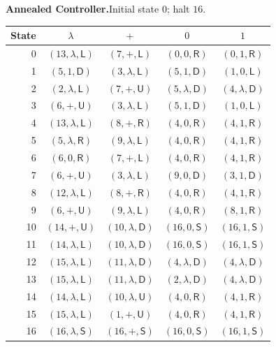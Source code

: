 \documentclass[11pt,a4paper]{article}
\newcommand{\blank}{\lambda}
\newcommand{\triple}[3]{(#1,#2,\mathsf{#3})}
\begin{document}
\vspace{5pt}
\textbf{Annealed Controller.}\quad Initial state $0$; halt $16$.
\begin{center}
\fontsize{9.4}{11.2}\selectfont\renewcommand{\arraystretch}{1.06}
\setlength{\tabcolsep}{10pt}
\begin{tabular}{rcccc}
\toprule
\rowcolor{Pale}State & $\blank$ & $+$ & $0$ & $1$\\
\midrule
0 & $\triple{13}{\blank}{L}$ & $\triple{7}{+}{L}$ & $\triple{0}{0}{R}$ & $\triple{0}{1}{R}$ \\
1 & $\triple{5}{1}{D}$ & $\triple{3}{\blank}{L}$ & $\triple{5}{1}{D}$ & $\triple{1}{0}{L}$ \\
2 & $\triple{2}{\blank}{L}$ & $\triple{7}{+}{U}$ & $\triple{5}{\blank}{D}$ & $\triple{4}{\blank}{D}$ \\
3 & $\triple{6}{+}{U}$ & $\triple{3}{\blank}{L}$ & $\triple{5}{1}{D}$ & $\triple{1}{0}{L}$ \\
4 & $\triple{13}{\blank}{L}$ & $\triple{8}{+}{R}$ & $\triple{4}{0}{R}$ & $\triple{4}{1}{R}$ \\
5 & $\triple{5}{\blank}{R}$ & $\triple{9}{\blank}{L}$ & $\triple{4}{0}{R}$ & $\triple{4}{1}{R}$ \\
6 & $\triple{6}{0}{R}$ & $\triple{7}{+}{L}$ & $\triple{4}{0}{R}$ & $\triple{4}{1}{R}$ \\
7 & $\triple{6}{+}{U}$ & $\triple{3}{\blank}{L}$ & $\triple{9}{0}{D}$ & $\triple{3}{1}{D}$ \\
8 & $\triple{12}{\blank}{L}$ & $\triple{8}{+}{R}$ & $\triple{4}{0}{R}$ & $\triple{4}{1}{R}$ \\
9 & $\triple{6}{+}{U}$ & $\triple{9}{\blank}{L}$ & $\triple{4}{0}{R}$ & $\triple{8}{1}{R}$ \\
10 & $\triple{14}{+}{U}$ & $\triple{10}{\blank}{D}$ & $\triple{16}{0}{S}$ & $\triple{16}{1}{S}$ \\
11 & $\triple{14}{\blank}{L}$ & $\triple{10}{\blank}{D}$ & $\triple{16}{0}{S}$ & $\triple{16}{1}{S}$ \\
12 & $\triple{15}{\blank}{L}$ & $\triple{11}{\blank}{D}$ & $\triple{4}{\blank}{D}$ & $\triple{4}{\blank}{D}$ \\
13 & $\triple{15}{\blank}{L}$ & $\triple{11}{\blank}{D}$ & $\triple{2}{\blank}{D}$ & $\triple{4}{\blank}{D}$ \\
14 & $\triple{14}{\blank}{L}$ & $\triple{10}{\blank}{U}$ & $\triple{4}{0}{R}$ & $\triple{4}{1}{R}$ \\
15 & $\triple{15}{\blank}{L}$ & $\triple{1}{+}{U}$ & $\triple{4}{0}{R}$ & $\triple{4}{1}{R}$ \\
16 & $\triple{16}{\blank}{S}$ & $\triple{16}{+}{S}$ & $\triple{16}{0}{S}$ & $\triple{16}{1}{S}$ \\
\bottomrule
\end{tabular}
\end{center}
\end{document}

